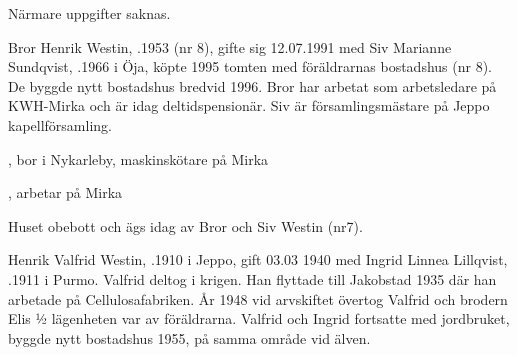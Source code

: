 Närmare uppgifter saknas.\jhvspace{}






Bror Henrik Westin, .1953 (nr 8), gifte sig 12.07.1991 med Siv Marianne Sundqvist, .1966 i Öja, köpte 1995 tomten med föräldrarnas bostadshus (nr 8). De byggde nytt bostadshus bredvid 1996. Bror har arbetat som arbetsledare på KWH-Mirka och är idag deltidspensionär. Siv är församlingsmästare på Jeppo kapellförsamling.
\begin{jhchildren}
  \item {}, bor i Nykarleby, maskinskötare på Mirka
  \item {}, arbetar på Mirka
\end{jhchildren}




Huset obebott och ägs idag av Bror och Siv Westin (nr7).\jhvspace{}



Henrik Valfrid Westin, .1910 i Jeppo, gift 03.03 1940 med Ingrid Linnea Lillqvist, .1911 i Purmo. Valfrid deltog i krigen. Han flyttade till Jakobstad 1935 där han arbetade på Cellulosafabriken. År 1948 vid arvskiftet övertog Valfrid och brodern Elis ½ lägenheten var av föräldrarna. Valfrid och Ingrid fortsatte med jordbruket, byggde nytt bostadshus 1955, på samma område vid älven.

